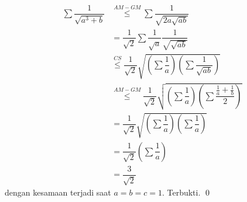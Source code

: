 
\begin{solusi}
\begin{align*}
    \sum \dfrac{1}{\sqrt{a^3+b}}
    &\overset{AM-GM}{\le}
    \sum\dfrac{1}{\sqrt{2a\sqrt{ab}}}\\
    &=
    \dfrac{1}{\sqrt{2}}\sum\dfrac{1}{\sqrt{a}}\dfrac{1}{\sqrt{\sqrt{{ab}}}}\\
    &\overset{CS}{\le}
    \dfrac{1}{\sqrt{2}}\sqrt{\left(\sum\dfrac{1}{a}\right)\left(\sum\dfrac{1}{\sqrt{ab}}\right)}\\
    &\overset{AM-GM}{\le}
    \dfrac{1}{\sqrt{2}}\sqrt{\left(\sum\dfrac{1}{a}\right)\left(\sum\dfrac{\frac{1}{a}+\frac{1}{b}}{2}\right)}\\
    &=
    \dfrac{1}{\sqrt{2}}\sqrt{\left(\sum\dfrac{1}{a}\right)\left(\sum\dfrac{1}{a}\right)}\\
    &=
    \dfrac{1}{\sqrt{2}}\left(\sum\dfrac{1}{a}\right)\\
    &=
    \dfrac{3}{\sqrt{2}}
\end{align*}
dengan kesamaan terjadi saat $a=b=c=1$. Terbukti. \qed
\end{solusi}